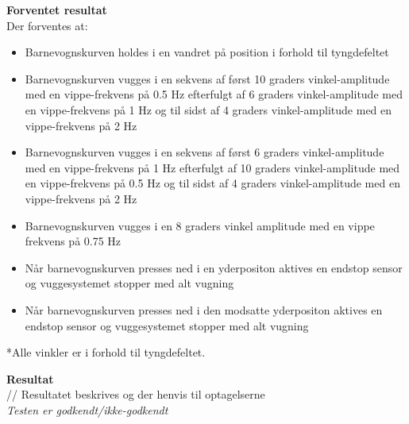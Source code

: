 \textbf{Forventet resultat} \\
Der forventes at:
\begin{itemize}
	\item Barnevognskurven holdes i en vandret på position i forhold til tyngdefeltet
	\item Barnevognskurven vugges i en sekvens af først 10 graders vinkel-amplitude med en vippe-frekvens på 0.5 Hz efterfulgt af 6 graders vinkel-amplitude med en vippe-frekvens på 1 Hz og til sidst af 4 graders vinkel-amplitude med en vippe-frekvens på 2 Hz
	\item Barnevognskurven vugges i en sekvens af først 6 graders vinkel-amplitude med en vippe-frekvens på 1 Hz efterfulgt af 10 graders vinkel-amplitude med en vippe-frekvens på 0.5 Hz og til sidst af 4 graders vinkel-amplitude med en vippe-frekvens på 2 Hz
	\item Barnevognskurven vugges i en 8 graders vinkel amplitude med en vippe frekvens på 0.75 Hz
	\item Når barnevognskurven presses ned i en yderpositon aktives en endstop sensor og vuggesystemet stopper med alt vugning 
	\item Når barnevognskurven presses ned i den modsatte yderpositon aktives en endstop sensor og vuggesystemet stopper med alt vugning 
\end{itemize}
*Alle vinkler er i forhold til tyngdefeltet.

\textbf{Resultat} \\
// Resultatet beskrives og der henvis til optagelserne \\


\textit{Testen er godkendt/ikke-godkendt}